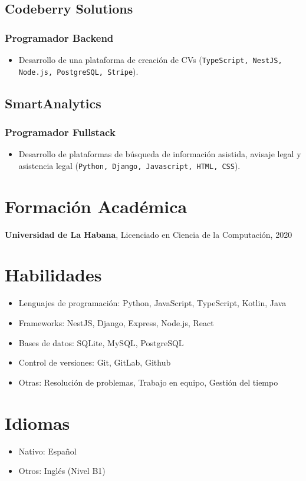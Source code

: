 \documentclass[11pt,a4paper,sans]{moderncv} \usepackage[utf8]{inputenc} \usepackage[T1]{fontenc} \usepackage{enumitem} \usepackage[top=0.6in, bottom=0.6in, left=0.75in, right=0.75in]{geometry} \usepackage{multido} \usepackage{hyperref} \usepackage{xcolor} \usepackage{csquotes}
\begin{document}
	\subsection{Codeberry Solutions} \subsubsection{Programador Backend} \begin{itemize} \item Desarrollo de una plataforma de creación de CVs (\texttt{TypeScript, NestJS, Node.js, PostgreSQL, Stripe}). \end{itemize}
	
	\subsection{SmartAnalytics} \subsubsection{Programador Fullstack} \begin{itemize} \item Desarrollo de plataformas de búsqueda de información asistida, avisaje legal y asistencia legal (\texttt{Python, Django, Javascript, HTML, CSS}). \end{itemize}
	
	\section{Formación Académica} \textbf{Universidad de La Habana}, Licenciado en Ciencia de la Computación, 2020
	
	\section{Habilidades} \begin{itemize} \item Lenguajes de programación: Python, JavaScript, TypeScript, Kotlin, Java \item Frameworks: NestJS, Django, Express, Node.js, React \item Bases de datos: SQLite, MySQL, PostgreSQL \item Control de versiones: Git, GitLab, Github \item Otras: Resolución de problemas, Trabajo en equipo, Gestión del tiempo \end{itemize}
	
	\section{Idiomas} \begin{itemize} \item Nativo: Español \item Otros: Inglés (Nivel B1) \end{itemize}
	
\end{document}
